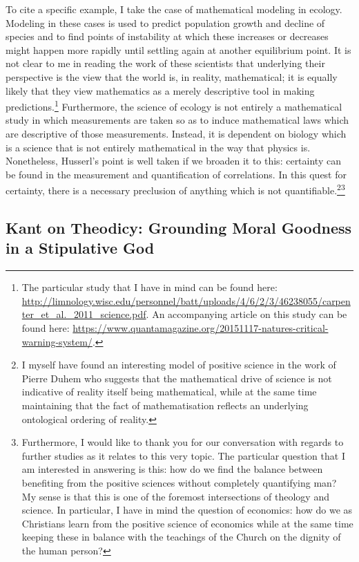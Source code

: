 \documentclass[12pt]{article}
\begin{document}
	 To cite a specific example, I take the case of mathematical modeling in ecology. Modeling in these cases is used to predict population growth and decline of species and to find points of instability at which these increases or decreases might happen more rapidly until settling again at another equilibrium point. It is not clear to me in reading the work of these scientists that underlying their perspective is the view that the world is, in reality, mathematical; it is equally likely that they view mathematics as a merely descriptive tool in making predictions.\footnote{The particular study that I have in mind can be found here: \url{http://limnology.wisc.edu/personnel/batt/uploads/4/6/2/3/46238055/carpenter_et_al._2011_science.pdf}. An accompanying article on this study can be found here: \url{https://www.quantamagazine.org/20151117-natures-critical-warning-system/}.} Furthermore, the science of ecology is not entirely a mathematical study in which measurements are taken so as to induce mathematical laws which are descriptive of those measurements. Instead, it is dependent on biology which is a science that is not entirely mathematical in the way that physics is. Nonetheless, Husserl's point is well taken if we broaden it to this: certainty can be found in the measurement and quantification of correlations. In this quest for certainty, there is a necessary preclusion of anything which is not quantifiable.\footnote{I myself have found an interesting model of positive science in the work of Pierre Duhem who suggests that the mathematical drive of science is not indicative of reality itself being mathematical, while at the same time maintaining that the fact of mathematisation reflects an underlying ontological ordering of reality.}\thinspace \footnote{Furthermore, I would like to thank you for our conversation with regards to further studies as it relates to this very topic. The particular question that I am interested in answering is this: how do we find the balance between benefiting from the positive sciences without completely quantifying man? My sense is that this is one of the foremost intersections of theology and science. In particular, I have in mind the question of economics: how do we as Christians learn from the positive science of economics while at the same time keeping these in balance with the teachings of the Church on the dignity of the human person?}
	 
	 

	\subsection*{Kant on Theodicy: Grounding Moral Goodness in a Stipulative God}
	
\end{document}
